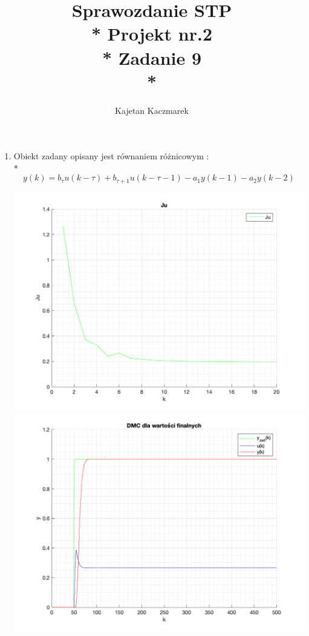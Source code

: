 \documentclass[a4paper, 11pt]{article}
\author{Kajetan Kaczmarek}
\begin{document}
\title{Sprawozdanie STP \\* Projekt nr.2 \\* 
Zadanie 9 \\*}
\maketitle
\begin{enumerate}
\item Obiekt zadany opisany jest równaniem różnicowym : \\*
\[  y(k) = b_{\tau}u(k-\tau) +  b_{\tau+1}u(k-\tau -1) -a_1y(k-1)-a_2y(k-2)  \]

\newpage
 \includegraphics{./Ju.png} 
 \includegraphics{./P6_3_DMC_Koncowe_.png} 

\end{enumerate}
\end{document}
